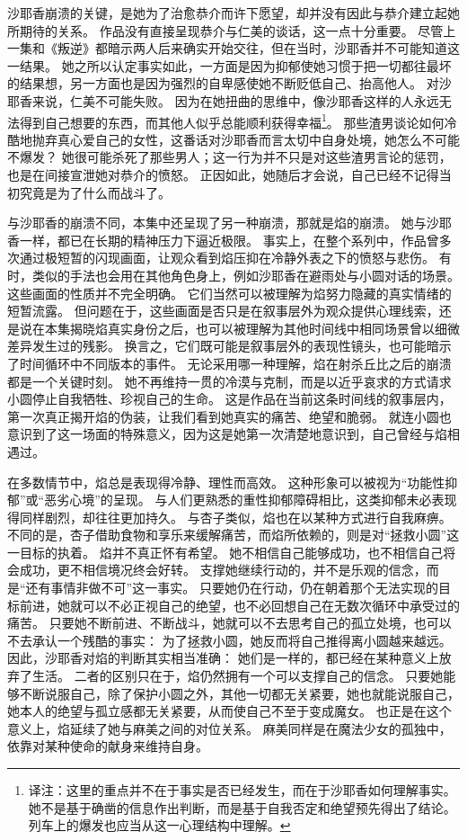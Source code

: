 沙耶香崩溃的关键，是她为了治愈恭介而许下愿望，却并没有因此与恭介建立起她所期待的关系。
作品没有直接呈现恭介与仁美的谈话，这一点十分重要。
尽管上一集和《叛逆》都暗示两人后来确实开始交往，但在当时，沙耶香并不可能知道这一结果。
她之所以认定事实如此，一方面是因为抑郁使她习惯于把一切都往最坏的结果想，另一方面也是因为强烈的自卑感使她不断贬低自己、抬高他人。
对沙耶香来说，仁美不可能失败。
因为在她扭曲的思维中，像沙耶香这样的人永远无法得到自己想要的东西，而其他人似乎总能顺利获得幸福\footnote{%
    译注：这里的重点并不在于事实是否已经发生，而在于沙耶香如何理解事实。
    她不是基于确凿的信息作出判断，而是基于自我否定和绝望预先得出了结论。
    列车上的爆发也应当从这一心理结构中理解。
}。
那些渣男谈论如何冷酷地抛弃真心爱自己的女性，这番话对沙耶香而言太切中自身处境，她怎么不可能不爆发？
她很可能杀死了那些男人；这一行为并不只是对这些渣男言论的惩罚，也是在间接宣泄她对恭介的愤怒。
正因如此，她随后才会说，自己已经不记得当初究竟是为了什么而战斗了。

与沙耶香的崩溃不同，本集中还呈现了另一种崩溃，那就是焰的崩溃。
她与沙耶香一样，都已在长期的精神压力下逼近极限。
事实上，在整个系列中，作品曾多次通过极短暂的闪现画面，让观众看到焰压抑在冷静外表之下的愤怒与悲伤。
有时，类似的手法也会用在其他角色身上，例如沙耶香在避雨处与小圆对话的场景。
这些画面的性质并不完全明确。
它们当然可以被理解为焰努力隐藏的真实情绪的短暂流露。
但问题在于，这些画面是否只是在叙事层外为观众提供心理线索，还是说在本集揭晓焰真实身份之后，也可以被理解为其他时间线中相同场景曾以细微差异发生过的残影。
换言之，它们既可能是叙事层外的表现性镜头，也可能暗示了时间循环中不同版本的事件。
无论采用哪一种理解，焰在射杀丘比之后的崩溃都是一个关键时刻。
她不再维持一贯的冷漠与克制，而是以近乎哀求的方式请求小圆停止自我牺牲、珍视自己的生命。
这是作品在当前这条时间线的叙事层内，第一次真正揭开焰的伪装，让我们看到她真实的痛苦、绝望和脆弱。
就连小圆也意识到了这一场面的特殊意义，因为这是她第一次清楚地意识到，自己曾经与焰相遇过。

在多数情节中，焰总是表现得冷静、理性而高效。
这种形象可以被视为“功能性抑郁”或“恶劣心境”的呈现。
与人们更熟悉的重性抑郁障碍相比，这类抑郁未必表现得同样剧烈，却往往更加持久\cite{apa2000dsm-iv-tr}。
与杏子类似，焰也在以某种方式进行自我麻痹。
不同的是，杏子借助食物和享乐来缓解痛苦，而焰所依赖的，则是对“拯救小圆”这一目标的执着。
焰并不真正怀有希望。
她不相信自己能够成功，也不相信自己将会成功，更不相信境况终会好转。
支撑她继续行动的，并不是乐观的信念，而是“还有事情非做不可”这一事实。
只要她仍在行动，仍在朝着那个无法实现的目标前进，她就可以不必正视自己的绝望，也不必回想自己在无数次循环中承受过的痛苦。
只要她不断前进、不断战斗，她就可以不去思考自己的孤立处境，也可以不去承认一个残酷的事实：
为了拯救小圆，她反而将自己推得离小圆越来越远。
因此，沙耶香对焰的判断其实相当准确：
她们是一样的，都已经在某种意义上放弃了生活。
二者的区别只在于，焰仍然拥有一个可以支撑自己的信念。
只要她能够不断说服自己，除了保护小圆之外，其他一切都无关紧要，她也就能说服自己，她本人的绝望与孤立感都无关紧要，从而使自己不至于变成魔女。
也正是在这个意义上，焰延续了她与麻美之间的对位关系。
麻美同样是在魔法少女的孤独中，依靠对某种使命的献身来维持自身。

